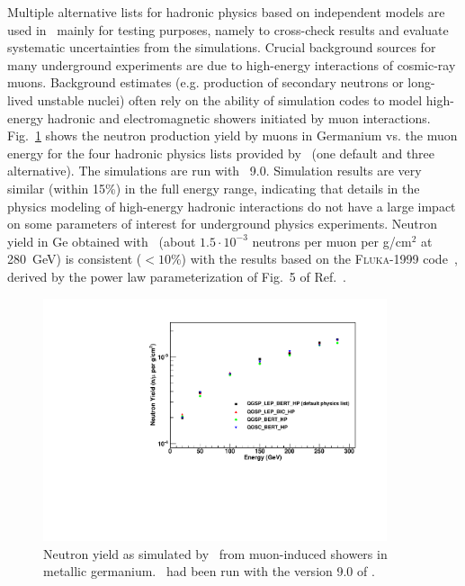 \documentclass[article]{IEEEtran}
\begin{document}
Multiple alternative lists for hadronic physics based on independent models are used 
in \MaGe\ mainly for testing purposes, namely to cross-check results and evaluate 
systematic uncertainties from the simulations. Crucial background sources for many 
underground experiments are due to high-energy interactions of cosmic-ray muons.
Background estimates (e.g. production of secondary neutrons or long-lived 
unstable nuclei) often rely on the ability of simulation codes to model high-energy 
hadronic and electromagnetic showers initiated by muon interactions. Fig.~\ref{fig:germanium_mc} shows 
the neutron production yield by muons in Germanium 
vs. the muon energy for the four hadronic physics lists provided by \MaGe\ (one default and 
three alternative). The simulations are run with \GF\ 9.0. 
Simulation results are very similar (within 15\%) in the full energy range, 
indicating that details in the physics modeling of high-energy hadronic interactions do not have a large 
impact on some parameters of interest for underground physics experiments. 
Neutron yield in Ge obtained with \MaGe\ (about $1.5\cdot10^{-3}$ neutrons per muon 
per g/cm$^{2}$ at 280~GeV) 
is consistent ($< 10\%$) with the results based on the \textsc{Fluka-1999} 
code~\cite{fluka}, derived by the power law parameterization of Fig.~5 of 
Ref.~\cite{Araujo:05}. \\
%
%
\begin{figure}[tbh]
\centering
\includegraphics[width=0.90\textwidth]{plots/germanium_mc.pdf}
\caption{Neutron yield as simulated by \MaGe\ from muon-induced showers in metallic germanium.
\MaGe\ had been run with the version 9.0 of \GF.}\label{fig:germanium_mc} 
\end{figure}
%
\end{document}
